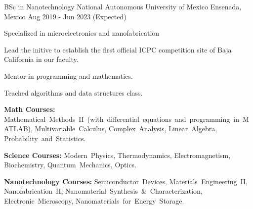 

\begin{cventries}

  \cventry
    {BSc in Nanotechnology} %
    {National Autonomous University of Mexico} %
    {Ensenada, Mexico} %
    {Aug 2019 - Jun 2023 (Expected)} %
    {
      \begin{cvitems} %
        \item {Specialized in microelectronics and nanofabrication}
        \item {Lead the initive to establish the first official ICPC competition site of Baja California in our faculty.}
        \item {Mentor in programming and mathematics.}
        \item {Teached algorithms and data structures class.}
        \item {\textbf{Math Courses:} Mathematical~Methods~II~(with~differential~equations~and~programming~in~MATLAB), Multivariable~Calculus, Complex~Analysis, Linear~Algebra, Probability~and~Statistics.}
        \item {\textbf{Science Courses:} Modern~Physics, Thermodynamics, Electromagnetism, Biochemistry, Quantum~Mechanics, Optics.}
        \item {\textbf{Nanotechnology Courses:} Semiconductor~Devices, Materials~Engineering~II, Nanofabrication~II,
        Nanomaterial~Synthesis~\&~Characterization, Electronic~Microscopy, Nanomaterials~for~Energy~Storage.}
      \end{cvitems}
    }
    
    

\end{cventries}
